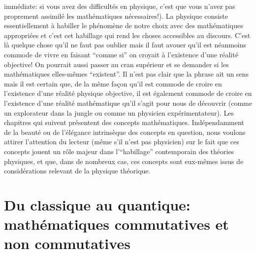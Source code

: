 imm\'ediate: si vous avez des difficult\'es en physique, c'est que
vous n'avez pas proprement assimil\'e les math\'ematiques
n\'ecessaires!). La physique consiste essentiellement \`a habiller le
ph\'enom\`ene de notre choix avec des math\'ematiques appropri\'ees et
c'est cet habillage qui rend les choses accessibles au discours.
C'est l\`a quelque chose qu'il ne faut pas oublier mais il faut
avouer qu'il est n\'eanmoins commode de vivre en faisant ``comme si'' on
croyait \`a l'existence d'une r\'ealit\'e objective! On pourrait
aussi passer au cran sup\'erieur et se demander si les
math\'ematiques elles-m\^emes ``existent''. Il n'est pas clair que la
phrase ait un sens mais il est certain que, de la m\^eme fa\c con
qu'il est commode de croire en l'existence d'une r\'ealit\'e physique
objective, il est \'egalement commode de  croire en l'existence d'une
r\'ealit\'e math\'ematique qu'il s'agit pour nous de d\'ecouvrir
(comme un explorateur dans la jungle ou comme un physicien
exp\'erimentateur).
Les chapitres qui suivent pr\'esentent des concepts math\'ematiques.
Ind\'ependamment de la beaut\'e ou de l'\'el\'egance intrins\`eque
des concepts en question, nous voulons attirer l'attention du
lecteur (m\^eme s'il n'est pas physicien) sur le fait que ces
concepts jouent un r\^ole majeur dans l'``habillage'' contemporain des
th\'eories physiques,  et que, dans de nombreux cas, ces concepts
sont eux-m\^emes issus de consid\'erations relevant de la physique
th\'eorique.

\section*{Du classique au quantique: math\'ematiques commutatives et non commutatives}

